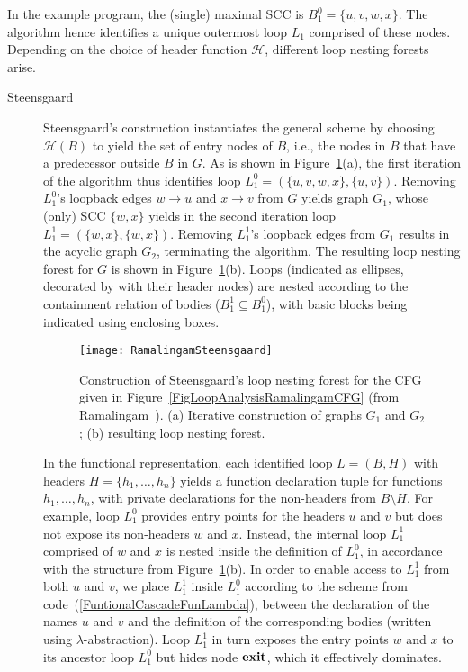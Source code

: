 In the example program, the (single) maximal SCC is $B^0_1 = \{u, v,
w, x\}$.  The algorithm hence identifies a unique outermost loop $L_1$
comprised of these nodes.  Depending on the choice of header function
$\mathcal{H}$, different loop nesting forests arise.

\begin{description}

\item[Steensgaard] Steensgaard's construction instantiates the general
  scheme by choosing $\mathcal{H}(B)$ to yield the set of entry nodes
  of $B$, i.e., the nodes in $B$ that have a predecessor outside $B$ in
  $G$. As is shown in
  Figure~\ref{FigLoopAnalysisRamalingamSteensgaard}(a), the first
  iteration of the algorithm thus identifies loop $L^0_1=(\{u,v,w,x\},
  \{u,v\})$.  Removing $L^0_1$'s loopback edges $w \to u$ and $x \to
  v$ from $G$ yields graph $G_1$, whose (only) SCC $\{w,x\}$ yields in
  the second iteration loop $L^1_1 = (\{w,x\}, \{w,x\})$.  Removing
  $L^1_1$'s loopback edges from $G_1$ results in the acyclic graph
  $G_2$, terminating the algorithm.  The resulting loop nesting forest
  for $G$ is shown in
  Figure~\ref{FigLoopAnalysisRamalingamSteensgaard}(b).  Loops
  (indicated as ellipses, decorated by with their header nodes) are
  nested according to the containment relation of bodies ($B^1_1
  \subseteq B^0_1$), with basic blocks being indicated using enclosing
  boxes.

  \begin{figure}
    \begin{center}
    \texttt{[image: RamalingamSteensgaard]}
    \end{center}
    \caption{\label{FigLoopAnalysisRamalingamSteensgaard} Construction
       of Steensgaard's loop nesting forest for the CFG given in
       Figure~\ref{FigLoopAnalysisRamalingamCFG} (from
       Ramalingam~\cite{DBLP:journals/toplas/Ramalingam02}). 
       (a) Iterative construction of graphs $G_1$ and $G_2$; 
       (b) resulting loop nesting forest.}
  \end{figure} 

  In the functional representation, each identified loop $L=(B,H)$
  with headers $H=\{h_1,\ldots,h_n\}$ yields a function declaration
  tuple for functions $h_1,\ldots,h_n$, with private declarations for
  the non-headers from $B \setminus H$. For example, loop $L^0_1$
  provides entry points for the headers $u$ and $v$ but does not
  expose its non-headers $w$ and $x$.  Instead, the internal loop
  $L^1_1$ comprised of $w$ and $x$ is nested inside the definition of
  $L^0_1$, in accordance with the structure from
  Figure~\ref{FigLoopAnalysisRamalingamSteensgaard}(b).  In order to
  enable access to $L^1_1$ from both $u$ and $v$, we place $L^1_1$
  inside $L^0_1$ according to the scheme from
  code~(\ref{FuntionalCascadeFunLambda}), between the declaration of
  the names $u$ and $v$ and the definition of the corresponding bodies
  (written using $\lambda$-abstraction). Loop $L^1_1$ in turn exposes
  the entry points $w$ and $x$ to its ancestor loop $L^0_1$ but hides
  node $\mathbf{exit}$, which it effectively dominates.  


\end{description}
